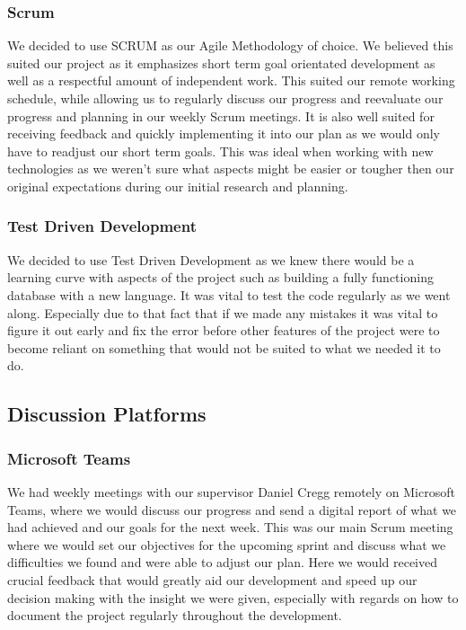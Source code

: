  \subsubsection{Scrum}
 We decided to use SCRUM as our Agile Methodology of choice. We believed this suited our project as it emphasizes short term goal orientated development as well as a respectful amount of independent work. This suited our remote working schedule, while allowing us to regularly discuss our progress and reevaluate our progress and planning in our weekly Scrum meetings. It is also well suited for receiving feedback and quickly implementing it into our plan as we would only have to readjust our short term goals. This was ideal when working with new technologies as we weren't sure what aspects might be easier or tougher then our original expectations during our  initial research and planning.
 
 \subsubsection{Test Driven Development}
 We decided to use Test Driven Development as we knew there would be a learning curve with aspects of the project such as building a fully functioning database with a new language. It was vital to test the code regularly as we went along. Especially due to that fact that if we made any mistakes it was vital to figure it out early and fix the error before other features of the project were to become reliant on something that would not be suited to what we needed it to do.
 
 \subsection{Discussion Platforms}
 \subsubsection{Microsoft Teams}
 We had weekly meetings with our supervisor Daniel Cregg remotely on Microsoft Teams, where we would discuss our progress and send a digital report of what we had achieved and our goals for the next week. This was our main Scrum meeting where we would set our objectives for the upcoming sprint and discuss what we difficulties we found and were able to adjust our plan. Here we would received crucial feedback that would greatly aid our development and speed up our decision making with the insight we were given, especially with regards on how to document the project regularly throughout the development.
 

